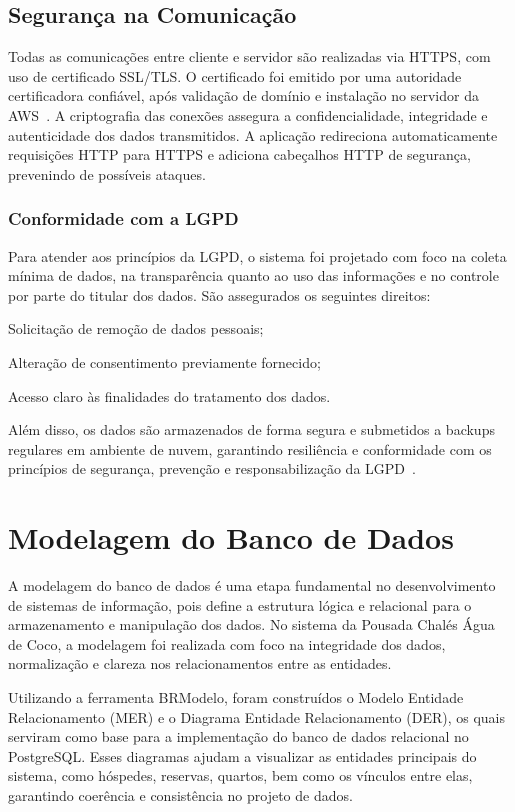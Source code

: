 \documentclass[
	12pt,				%
	openany,			%
	oneside,			%
	a4paper,			%
	english,			%
	french,				%
	spanish,			%
	brazil				%
	]{abntex2}
\begin{document}
\subsection{Segurança na Comunicação}

Todas as comunicações entre cliente e servidor são realizadas via HTTPS, com uso de certificado SSL/TLS. O certificado foi emitido por uma autoridade certificadora confiável, após validação de domínio e instalação no servidor da AWS~\cite{aws-doc}. A criptografia das conexões assegura a confidencialidade, integridade e autenticidade dos dados transmitidos.
A aplicação redireciona automaticamente requisições HTTP para HTTPS e adiciona cabeçalhos HTTP de segurança, prevenindo de possíveis ataques.


\subsubsection{Conformidade com a LGPD}
Para atender aos princípios da LGPD, o sistema foi projetado com foco na coleta mínima de dados, na transparência quanto ao uso das informações e no controle por parte do titular dos dados. São assegurados os seguintes direitos:

Solicitação de remoção de dados pessoais;

Alteração de consentimento previamente fornecido;

Acesso claro às finalidades do tratamento dos dados.

Além disso, os dados são armazenados de forma segura e submetidos a backups regulares em ambiente de nuvem, garantindo resiliência e conformidade com os princípios de segurança, prevenção e responsabilização da LGPD~\cite{lgpd}.


\section{Modelagem do Banco de Dados}
A modelagem do banco de dados é uma etapa fundamental no desenvolvimento de sistemas de informação, pois define a estrutura lógica e relacional para o armazenamento e manipulação dos dados. No sistema da Pousada Chalés Água de Coco, a modelagem foi realizada com foco na integridade dos dados, normalização e clareza nos relacionamentos entre as entidades.

Utilizando a ferramenta BRModelo, foram construídos o Modelo Entidade Relacionamento (MER) e o Diagrama Entidade Relacionamento (DER), os quais serviram como base para a implementação do banco de dados relacional no PostgreSQL. Esses diagramas ajudam a visualizar as entidades principais do sistema, como hóspedes, reservas, quartos, bem como os vínculos entre elas, garantindo coerência e consistência no projeto de dados.
\end{document}
